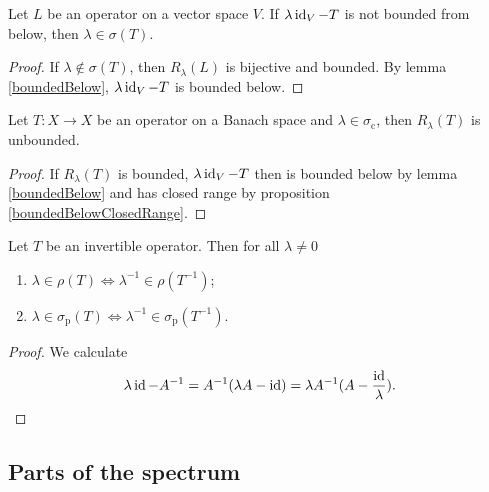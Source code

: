 \begin{lemma}
Let $L$ be an operator on a vector space $V$. If $\lambda \operatorname{id}_V - T$ is not bounded from below, then $\lambda \in \sigma(T)$.
\end{lemma}
\begin{proof}
If $\lambda \notin \sigma(T)$, then $R_\lambda(L)$ is bijective and bounded. By lemma \ref{boundedBelow}, $\lambda \operatorname{id}_V - T$ is bounded below.
\end{proof}


\begin{lemma}
Let $T:X\to X$ be an operator on a Banach space and $\lambda\in\sigma_\text{c}$, then $R_\lambda(T)$ is unbounded.
\end{lemma}
\begin{proof}
If $R_\lambda(T)$ is bounded, $\lambda \operatorname{id}_V - T$ then is bounded below by lemma \ref{boundedBelow} and has closed range by proposition \ref{boundedBelowClosedRange}.
\end{proof}

\begin{proposition}
Let $T$ be an invertible operator. Then for all $\lambda\neq 0$
\begin{enumerate}
\item $\lambda\in\rho(T) \iff \lambda^{-1}\in \rho(T^{-1})$;
\item $\lambda\in\sigma_\text{p}(T) \iff \lambda^{-1}\in \sigma_\text{p}(T^{-1})$.
\end{enumerate}
\end{proposition}
\begin{proof}
We calculate
\[ \lambda \operatorname{id} - A^{-1} = A^{-1}(\lambda A - \operatorname{id}) = \lambda A^{-1}(A - \frac{\operatorname{id}}{\lambda}). \]
\end{proof}

\subsection{Parts of the spectrum}
